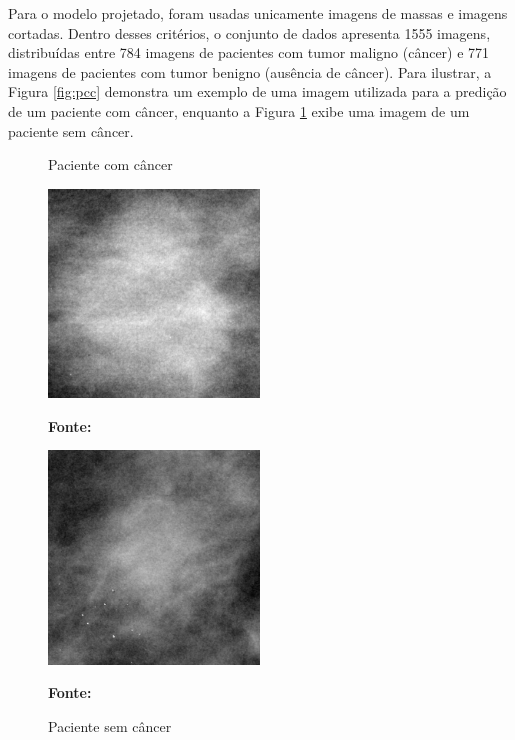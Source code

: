 Para o modelo projetado, foram usadas unicamente imagens de massas e imagens cortadas. Dentro desses critérios, o conjunto de dados apresenta 1555 imagens, distribuídas entre 784 imagens de pacientes com tumor maligno (câncer) e 771 imagens de pacientes com tumor benigno (ausência de câncer). Para ilustrar, a Figura \ref{fig:pcc} demonstra um exemplo de uma imagem utilizada para a predição de um paciente com câncer, enquanto a Figura \ref{fig:psc} exibe uma imagem de um paciente sem câncer. 


\begin{figure}[ht]
\centering
    \begin{minipage}[b]{0.45\textwidth}
        \centering
        \caption{Paciente com câncer}
        \includegraphics[width=0.5\textwidth]{figuras/with_cancer.jpg}
        \label{fig:pcc}
        
        \textbf{\footnotesize Fonte: \href{https://www.kaggle.com/datasets/awsaf49/cbis-ddsm-breast-cancer-image-dataset}{\cite{newdatabase}}}
    \end{minipage}
    \hfill
    \begin{minipage}[b]{0.45\textwidth}
        \centering
        \caption{Paciente sem câncer}
        \includegraphics[width=0.5\textwidth]{figuras/without_cancer.jpg}
        \label{fig:psc}
        
        \textbf{\footnotesize Fonte: \href{https://www.kaggle.com/datasets/awsaf49/cbis-ddsm-breast-cancer-image-dataset}{\cite{newdatabase}}}
    \end{minipage}
\end{figure}


